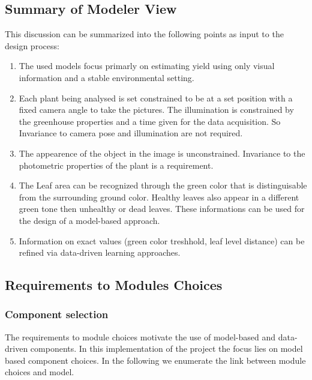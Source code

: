 \graphicspath{{members/paz/figures/}}

\subsection{Summary of Modeler View}\label{subsec:summary-of-modeler-view}


This discussion can be summarized into the following points as input to the
design process:

\begin{enumerate}
    \item The used models focus primarly on estimating yield using only visual information and a stable environmental setting.
    
    \item Each plant being analysed is set constrained to be at a set position with a fixed camera angle to take the pictures. The illumination is constrained by the greenhouse properties and a time given for the data acquisition. So Invariance to camera pose and illumination are not required.
    
    \item The appearence of the object in the image is unconstrained. Invariance to the photometric properties of the plant is a requirement.
    
    \item The Leaf area can be recognized through the green color that is distinguisable from the surrounding ground color. Healthy leaves also appear in a  different green tone then unhealthy or dead leaves. These informations can be used for the design of a model-based approach.
    
    \item Information on exact values (green color treshhold, leaf level distance) can be refined via data-driven learning approaches.
    
\end{enumerate}

\subsection{Requirements to Modules Choices}


\subsubsection*{Component selection}

The requirements to module choices motivate the use of model-based and data-driven components. In this implementation of the project the focus lies on model based component choices. In the following we enumerate the link between module choices and model.


